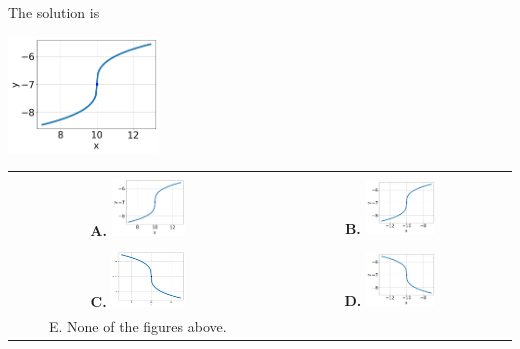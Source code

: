 \documentclass{article}[14pt]
\begin{document}
 
 The solution is  
 \begin{center} \includegraphics[width=0.3\textwidth]{../Figures/radicalEquationToGraphAA.png} \end{center}\begin{tabular}{|c|c|} 
\hline 
 & \tabularnewline 
 \textbf{A.} \includegraphics[width=0.3\textwidth]{../Figures/radicalEquationToGraphAA.png} & \textbf{B.} \includegraphics[width=0.3\textwidth]{../Figures/radicalEquationToGraphAB.png} \tabularnewline 
\hline 
 & \tabularnewline 
 \textbf{C.} \includegraphics[width=0.3\textwidth]{../Figures/radicalEquationToGraphAC.png} & \textbf{D.} \includegraphics[width=0.3\textwidth]{../Figures/radicalEquationToGraphAD.png} \tabularnewline 
\hline 
 E. None of the figures above. & \tabularnewline 
\hline 
 \end{tabular} 
 
\end{document}
